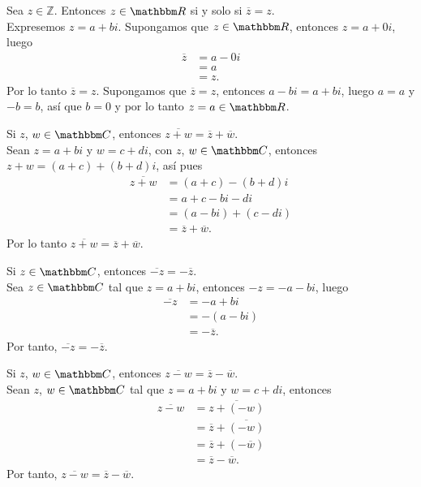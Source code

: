 \begin{proposition}
    Sea $z \in \mathbb{Z}$. Entonces $z \in \RR$ si y solo si $\overline{z}=z$. \\
    \demostracion Expresemos $z=a+bi$. Supongamos que $z \in \RR$, entonces $z=a+0i$, luego
    \begin{align*}
        \overline{z} &=a-0i \\
        & = a \\
        & = z.
    \end{align*}
    Por lo tanto $\overline{z}=z$. Supongamos que $\overline{z}=z$, entonces $a-bi=a+bi$, luego $a=a$ y $-b=b$, así que $b=0$ y por lo tanto $z=a \in \RR$.
\end{proposition}

\begin{proposition}
    Si $z$, $w \in \CC$, entonces $\overline{z+w}=\overline{z} +\overline{w}$. \\
    \demostracion Sean $z=a+bi$ y $w=c+di$, con $z$, $w \in \CC$, entonces $z+w=(a+c)+(b+d)i$, así pues
    \begin{align*}
        \overline{z+w} & =(a+c)-(b+d)i \\
        &=a+c-bi-di \\
        &=(a-bi)+(c-di) \\
        &=\overline{z} + \overline{w}.
    \end{align*}
    Por lo tanto $\overline{z+w}=\overline{z} + \overline{w}$.
\end{proposition}

\begin{proposition}
    Si $z \in \CC$, entonces $\overline{-z}=- \overline{z}$. \\
    \demostracion Sea $z \in \CC$ tal que $z=a+bi$, entonces $-z=-a-bi$, luego
    \begin{align*}
        \overline{-z} &=-a+bi \\
        & =-(a-bi) \\
        & =- \overline{z}.
    \end{align*}
    Por tanto, $\overline{-z}=- \overline{z}$.
\end{proposition}

\begin{proposition}
    Si $z$, $w \in \CC$, entonces $\overline{z-w}=\overline{z} - \overline{w}$. \\
    \demostracion Sean $z$, $w \in \CC$ tal que $z=a+bi$ y $w=c+di$, entonces
    \begin{align*}
        \overline{z-w} &=\overline{z+(-w)} \\
        &=\overline{z} + \overline{(-w)} \\
        &=\overline{z} + (- \overline{w}) \\
        &=\overline{z} - \overline{w}.
    \end{align*}
    Por tanto, $\overline{z-w}=\overline{z} - \overline{w}$.
\end{proposition}

